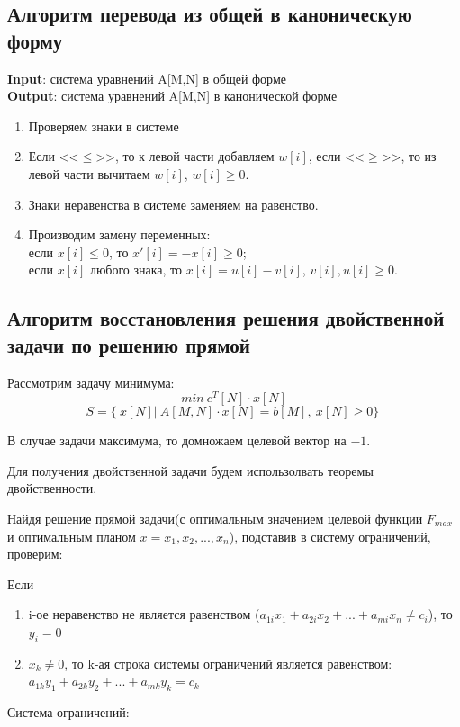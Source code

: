 \documentclass{article}
\begin{document}
    \subsection{Алгоритм перевода из общей в каноническую форму}
	\textbf{Input}: система уравнений A[M,N] в общей форме\\
    \textbf{Output}: система уравнений A[M,N] в канонической форме
	\begin{enumerate}
		\item Проверяем знаки в системе
		\item Если <<$\le$>>, то к левой части добавляем $w[i]$, если <<$\ge$>>, то из левой части вычитаем $w[i]$, $w[i]\ge0$.
		\item Знаки неравенства в системе заменяем на равенство.
		\item Производим замену переменных: \\если $x[i]\le0$, то $x'[i]=-x[i]\ge0$; \\если $x[i]$ любого знака, то $x[i]=u[i]-v[i]$, $v[i],u[i] \ge 0$.
	\end{enumerate}

    \subsection{Алгоритм восстановления решения двойственной задачи по решению прямой}
    Рассмотрим задачу минимума:
    	\begin{equation*}
              min~c^T[N] \cdot x[N]
            \end{equation*}
            \begin{equation}
            S = \{\ x[N]|~ A[M, N] \cdot x[N] = b[M],~x[N] \ge 0 \}\
            \label{one}
        \end{equation}

    В случае задачи максимума, то домножаем целевой вектор на $-1$.

    Для получения двойственной задачи будем использолвать теоремы двойственности.

     Найдя решение прямой задачи(с оптимальным значением целевой функции $F_{max}$ и оптимальным планом $x = x_1, x_2,..., x_n$), подставив в систему ограничений, проверим:

     Если
     \begin{enumerate}
         \item i-ое неравенство не является равенством ($a_{1i}x_1 + a_{2i}x_2 + ... + a_{mi}x_n \neq c_i$), то $y_i = 0$
         \item $x_k \neq 0$, то k-ая строка системы ограничений является равенством:
         $a_{1k}y_1 + a_{2k}y_2 + ... + a_{mk}y_k = c_k$
     \end{enumerate}
     Система ограничений:
\end{document}
